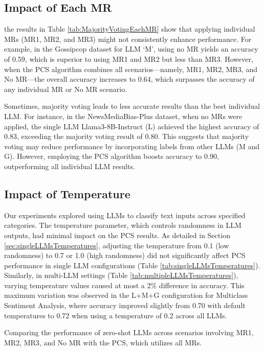 \subsection{Impact of Each MR}
the results in Table \ref{tab:MajorityVotingEachMR}
show that applying individual MRs (MR1, MR2, and MR3) might not consistently enhance performance. For example, in the Gossipcop dataset for LLM `M', using no MR yields an accuracy of 0.59, which is superior to using MR1 and MR2 but less than MR3. However, when the PCS algorithm combines all scenarios—namely, MR1, MR2, MR3, and No MR—the overall accuracy increases to 0.64, which surpasses the accuracy of any individual MR or No MR scenario.


Sometimes, majority voting leads to less accurate results than the best individual LLM. For instance, in the NewsMediaBias-Plus dataset, when no MRs were applied, the single LLM Llama3-8B-Instruct (L) achieved the highest accuracy of 0.83, exceeding the majority voting result of 0.80. This suggests that majority voting may reduce performance by incorporating labels from other LLMs (M and G). However, employing the PCS algorithm boosts accuracy to 0.90, outperforming all individual LLM results. %

\subsection{Impact of Temperature}
Our experiments explored using LLMs to classify text inputs across specified categories. The temperature parameter, which controls randomness in LLM outputs, had minimal impact on the PCS results. As detailed in Section \ref{sec:singleLLMsTemperatures}, adjusting the temperature from 0.1 (low randomness) to 0.7 or 1.0 (high randomness) did not significantly affect PCS performance in single LLM configurations (Table \ref{tab:singleLLMsTemperatures}). Similarly, in multi-LLM settings (Table \ref{tab:multipleLLMsTemperatures}), varying temperature values caused at most a 2\% difference in accuracy. This maximum variation was observed in the L+M+G configuration for Multiclass Sentiment Analysis, where accuracy improved slightly from 0.70 with default temperatures to 0.72 when using a temperature of 0.2 across all LLMs.






\begin{table}[t]
\centering%
\caption{Comparing the performance of zero-shot LLMs across scenarios involving MR1, MR2, MR3, and No MR with the PCS, which utilizes all MRs.}
\label{tab:MajorityVotingEachMR}
\vskip 0.15in

{

}
\vskip -0.1in

\end{table}
